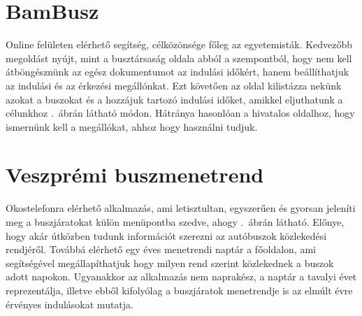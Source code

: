 \section*{BamBusz}
\label{bambusz}

Online felületen elérhető segítség, célközönsége főleg az egyetemisták. 
Kedvezőbb megoldást nyújt, mint a busztársaság oldala abból a szempontból, hogy nem kell átböngésznünk az egész dokumentumot az indulási időkért, hanem beállíthatjuk az indulási és az érkezési megállónkat. 
Ezt követően az oldal kilistázza nekünk azokat a buszokat és a hozzájuk tartozó indulási időket, amikkel eljuthatunk a célunkhoz .\ ábrán látható módon. 
Hátránya hasonlóan a hivatalos oldalhoz, hogy ismernünk kell a megállókat, ahhoz hogy használni tudjuk. 


\section*{Veszprémi buszmenetrend}
\label{veszprbuszmen}

Okostelefonra elérhető alkalmazás, ami letisztultan, egyszerűen és gyorsan jeleníti meg a buszjáratokat külön menüpontba szedve, ahogy .\ ábrán látható. 
Előnye, hogy akár útközben tudunk információt szerezni az autóbuszok közlekedési rendjéről. 
Továbbá elérhető egy éves menetrendi naptár a főoldalon, ami segítségével megállapíthatjuk hogy milyen rend szerint közlekednek a buszok adott napokon. 
Ugyanakkor az alkalmazás nem naprakész, a naptár a tavalyi évet reprezentálja, illetve ebből kifolyólag a buszjáratok menetrendje is az elmúlt évre érvényes indulásokat mutatja.

\newpage

